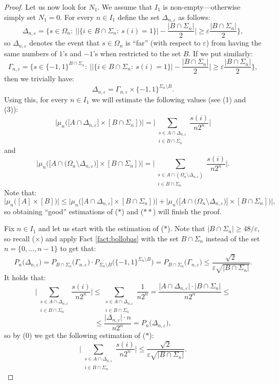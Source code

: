 \documentclass[11pt]{amsart}
\theoremstyle{definition}
\theoremstyle{remark}
\numberwithin{equation}{section}
\newcommand{\eps}{\varepsilon}
\newcommand{\sm}{\setminus}
\begin{document}
\begin{proof}
Let us now look for $N_1$. We assume that $I_1$ is non-empty---otherwise simply set $N_1=0$.  For every $n\in I_1$ define the set $\Delta_{n,\eps}$ as follows:
\[\Delta_{n,\eps}=\Big\{s\in\Omega_n\colon\ \Big|\big|\big\{i\in B\cap\Sigma_n\colon\ s(i)=1\big\}\big|-\frac{\big|B\cap\Sigma_n\big|}{2}\Big|\ge\eps\frac{\big|B\cap\Sigma_n\big|}{2}\Big\},\]
so $\Delta_{n,\eps}$ denotes the event that $s\in\Omega_n$ is ``far'' (with respect to $\eps$) from having the same numbers of $1$'s and $-1$'s when restricted to the set $B$. If we put similarly:
\[\Gamma_{n,\eps}=\Big\{s\in\{-1,1\}^{B\cap\Sigma_n}\colon\ \Big|\big|\big\{i\in B\cap\Sigma_n\colon\ s(i)=1\big\}\big|-\frac{\big|B\cap\Sigma_n\big|}{2}\Big|\ge\eps\frac{\big|B\cap\Sigma_n\big|}{2}\Big\},\]
then we trivially have:
\[\tag{$\times$}\Delta_{n,\eps}=\Gamma_{n,\eps}\times\{-1,1\}^{\Sigma_n\sm B}.\]
Using this, for every $n\in I_1$ we will estimate the following values (see (1) and (3)):
\[\tag{$*$}\big|\mu_n\big(\big[A\cap\Delta_{n,\eps}\big]\times[B\cap\Sigma_n]\big)\big|=\Big|\sum_{\substack{s\in A\cap\Delta_{n,\eps}\\i\in B\cap\Sigma_n}}\frac{s(i)}{n2^n}\Big|\]
and
\[\tag{$**$}\big|\mu_n\big(\big[A\cap\big(\Omega_n\sm\Delta_{n,\eps}\big)\big]\times[B\cap\Sigma_n]\big)\big|=\Big|\sum_{\substack{s\in A\cap(\Omega_n\sm\Delta_{n,\eps})\\i\in B\cap\Sigma_n}}\frac{s(i)}{n2^n}\Big|.\]
Note that:
\[\big|\mu_n\big([A]\times[B]\big)\big|\le\big|\mu_n\big(\big[A\cap\Delta_{n,\eps}\big]\times[B\cap\Sigma_n]\big)\big|+\big|\mu_n\big(\big[A\cap\big(\Omega_n\sm\Delta_{n,\eps}\big)\big]\times[B\cap\Sigma_n]\big)\big|,\]
so obtaining ``good'' estimations of ($*$) and ($**$) will finish the proof.

\medskip

Fix $n\in I_1$ and let us start with the estimation of ($*$). Note that $\big|B\cap\Sigma_n\big|\ge48/\eps$, so recall ($\times$) and apply Fact \ref{fact:bollobas} with the set $B\cap\Sigma_n$ instead of the set $n=\{0,\ldots,n-1\}$ to get that: %
\[\tag{$0$}P_n\big(\Delta_{n,\eps}\big)=P_{B\cap\Sigma_n}\big(\Gamma_{n,\eps}\big)\cdot P_{\Sigma_n\sm B}\Big(\{-1,1\}^{\Sigma_n\sm B}\Big)=P_{B\cap\Sigma_n}\big(\Gamma_{n,\eps}\big)\le\frac{\sqrt{2}}{\eps\sqrt{\big|B\cap\Sigma_n\big|}}.\]
It holds that:
\[\Big|\sum_{\substack{s\in A\cap\Delta_{n,\eps}\\i\in B\cap\Sigma_n}}\frac{s(i)}{n2^n}\Big|\le\sum_{\substack{s\in A\cap\Delta_{n,\eps}\\i\in B\cap\Sigma_n}}\frac{1}{n2^n}=\frac{\big|A\cap\Delta_{n,\eps}\big|\cdot\big|B\cap\Sigma_n\big|}{n2^n}\le\]
\[\le\frac{\big|\Delta_{n,\eps}\big|\cdot n}{n2^n}=P_n\big(\Delta_{n,\eps}\big),\]
so by (0) we get the following estimation of ($*$):
\[\tag{$1$}\Big|\sum_{\substack{s\in A\cap\Delta_{n,\eps}\\i\in B\cap\Sigma_n}}\frac{s(i)}{n2^n}\Big|\le\frac{\sqrt{2}}{\eps\sqrt{\big|B\cap\Sigma_n\big|}}.\]


\end{proof}
\end{document}

